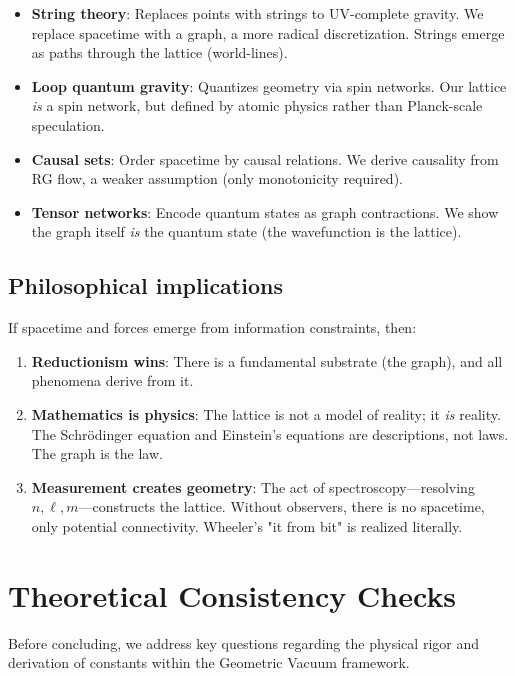 \documentclass[aps,prd,twocolumn,superscriptaddress,groupedaddress,showpacs]{revtex4-2}
\begin{document}
\begin{itemize}
\item \textbf{String theory}: Replaces points with strings to UV-complete gravity. We replace spacetime with a graph, a more radical discretization. Strings emerge as paths through the lattice (world-lines).

\item \textbf{Loop quantum gravity}: Quantizes geometry via spin networks. Our lattice \emph{is} a spin network, but defined by atomic physics rather than Planck-scale speculation.

\item \textbf{Causal sets}: Order spacetime by causal relations. We derive causality from RG flow, a weaker assumption (only monotonicity required).

\item \textbf{Tensor networks}: Encode quantum states as graph contractions. We show the graph itself \emph{is} the quantum state (the wavefunction is the lattice).
\end{itemize}

\subsection{Philosophical implications}

If spacetime and forces emerge from information constraints, then:
\begin{enumerate}
\item \textbf{Reductionism wins}: There is a fundamental substrate (the graph), and all phenomena derive from it.

\item \textbf{Mathematics is physics}: The lattice is not a model of reality; it \emph{is} reality. The Schrödinger equation and Einstein's equations are descriptions, not laws. The graph is the law.

\item \textbf{Measurement creates geometry}: The act of spectroscopy---resolving $n, \ell, m$---constructs the lattice. Without observers, there is no spacetime, only potential connectivity. Wheeler's "it from bit" is realized literally.
\end{enumerate}

\section{Theoretical Consistency Checks}

Before concluding, we address key questions regarding the physical rigor and derivation of constants within the Geometric Vacuum framework.
\end{document}
